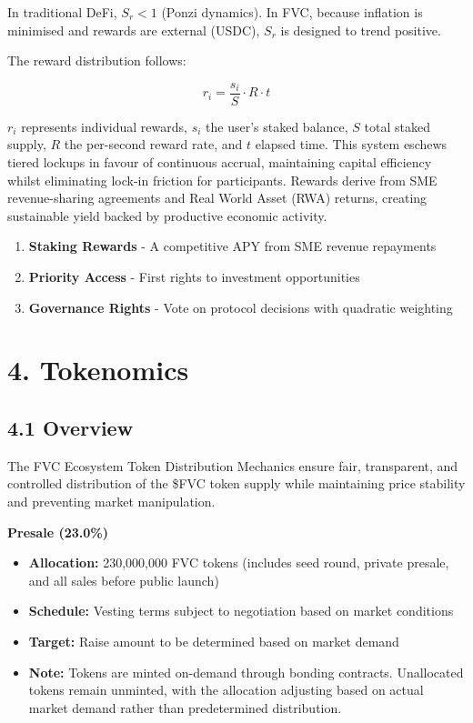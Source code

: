 \documentclass[
  paper=a4,
  ,captions=tableheading
]{scrartcl}
\providecommand{\tightlist}{%
  \setlength{\itemsep}{0pt}\setlength{\parskip}{0pt}}
\begin{document}
In traditional DeFi, $S_r < 1$ (Ponzi dynamics). In FVC, because inflation is minimised and rewards are external (USDC), $S_r$ is designed to trend positive.

The reward distribution follows:

\[
r_i = \frac{s_i}{S} \cdot R \cdot t
\]

$r_i$ represents individual rewards, $s_i$ the user's staked balance, $S$ total staked supply, $R$ the per-second reward rate, and $t$ elapsed time. This system eschews tiered lockups in favour of continuous accrual, maintaining capital efficiency whilst eliminating lock-in friction for participants. Rewards derive from SME revenue-sharing agreements and Real World Asset (RWA) returns, creating sustainable yield backed by productive economic activity.

\begin{enumerate}
    \item{\textbf{Staking Rewards}} - A competitive APY from SME revenue repayments
    \item{\textbf{Priority Access}} - First rights to investment opportunities
    \item{\textbf{Governance Rights}} - Vote on protocol decisions with quadratic weighting
\end{enumerate}
\newpage
\section{4. Tokenomics}\label{token-distribution-mechanics}

\subsection{4.1 Overview}\label{overview-1}

The FVC Ecosystem Token Distribution Mechanics ensure fair, transparent,
and controlled distribution of the \$FVC token supply while maintaining
price stability and preventing market manipulation.

\textbf{Presale (23.0\%)}

\begin{itemize}
\tightlist
\item
  \textbf{Allocation:} 230,000,000 FVC tokens
  (includes seed round, private presale, and all sales before public launch)
\item
  \textbf{Schedule:} Vesting terms subject to negotiation based on
  market conditions
\item
  \textbf{Target:} Raise amount to be determined based on market demand
\item
  \textbf{Note:} Tokens are minted on-demand through bonding contracts.
  Unallocated tokens remain unminted, with the allocation adjusting
  based on actual market demand rather than predetermined distribution.
\end{itemize}
\end{document}
